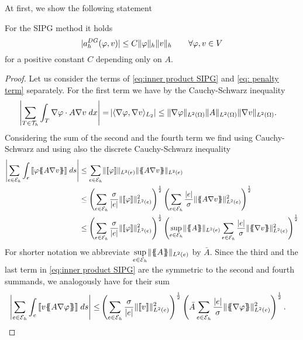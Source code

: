At first, we show the following statement
\begin{lemma}\label{la: SIPG continuous}
	For the SIPG method it holds
	\[
	|a_h^{DG}(\varphi, v) | \leq C \lVert \varphi \rVert_{h} \lVert v \rVert_{h} \qquad \forall \varphi,v \in V
	\]
	for a positive constant $C$ depending only on $A$.
\end{lemma}
\begin{proof}
	Let us consider the terms of \eqref{eq:inner product SIPG} and \eqref{eq: penalty term} separately.
	For the first term we have by the Cauchy-Schwarz inequality
	\begin{align}
	\left| \sum\limits_{T \in \mathcal{T}_h} \int_{T} {{ \nabla \varphi \cdot A \nabla v}\;dx} \right|
	 =& \left|   \langle \nabla \varphi, \nabla v \rangle _{L_2}  \right|
	  \leq \lVert \nabla \varphi \rVert_{L^2(\Omega)} \lVert A \rVert_{L^2(\Omega)} \lVert \nabla v \rVert_{L^2(\Omega)}. \label{eq: CS estimate 0}
	\end{align}
	Considering the sum of the second and the fourth term we find using Cauchy-Schwarz and using also the discrete Cauchy-Schwarz inequality
	\begin{align}
	\singleNorm{\sum\limits_{e \in \edges}\myIntS e { \jump {\varphi \average{A \nabla v} }}} &\leq
	\sum\limits_{e \in \edges}  \LTwonormE{\jump {\varphi}} \LTwonormE {\average{A \nabla v}} \nonumber \\
	& \leq
	\left( \sum\limits_{e \in \edges} \frac {\sigma}{|e|} \LTwonormE{\jump {\varphi}}^2 \right)^{\frac 1 2}
	\left( \sum\limits_{e \in \edges} \frac {|e|} \sigma \LTwonormE{\average{A \nabla v}}^2 \right)^{\frac 1 2} 	 \nonumber \\
	& \leq
	\left( \sum\limits_{e \in \edges} \frac {\sigma}{|e|} \LTwonormE{\jump {\varphi}}^2 \right)^{\frac 1 2}
	 \left( \sup\limits_{e \in \edges} \LTwonormE{\average{A}}\sum\limits_{e \in \edges} \frac {|e|} \sigma \LTwonormE{\average{\nabla v}}^2 \right)^{\frac 1 2} \label{eq: CS estimate}
	\end{align}
	For shorter notation we abbreviate $\sup\limits_{e \in \mathcal{E}_h} \lVert \{\!\!\{ A \}\!\!\} \rVert_{L^2(e)}$ by $\bar A$. Since the third and the last term in \eqref{eq:inner product SIPG} are the symmetric to the second and fourth summands, we analogously have for their sum
	\begin{align}
	\singleNorm{\sum\limits_{e \in \edges}\myIntS e { \jump {v \average{A \nabla \varphi} }}} \leq&
	\left( \sum\limits_{e \in \edges} \frac {\sigma}{|e|}\LTwonormE{\jump {v}}^2 \right)^{\frac 1 2}
	\left( \bar A \sum\limits_{e \in \edges} \frac {|e|} \sigma \LTwonormE{\average{\nabla \varphi}}^2 \right)^{\frac 1 2}.\label{eq: CS estimate2}

\end{align}
\end{proof}
